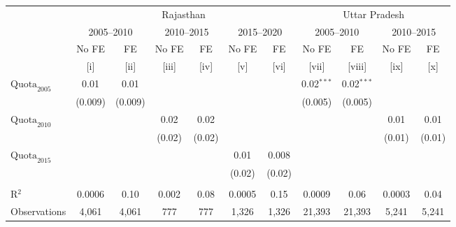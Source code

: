 
\begingroup
\centering
\scriptsize
\begin{adjustbox}{max width=\linewidth}
   \begin{threeparttable}[b]
      \begin{tabular}{lcccccccccc}
         \toprule
          & \multicolumn{6}{c}{Rajasthan} & \multicolumn{4}{c}{Uttar Pradesh} \\ 
          & \multicolumn{2}{c}{2005--2010} & \multicolumn{2}{c}{2010--2015} & \multicolumn{2}{c}{2015--2020} & \multicolumn{2}{c}{2005--2010} & \multicolumn{2}{c}{2010--2015} \\ 
                                & No FE   & FE            & No FE  & FE            & No FE  & FE            & No FE        & FE            & No FE  & FE \\   
                                & [i]     & [ii]          & [iii]  & [iv]          & [v]    & [vi]          & [vii]        & [viii]        & [ix]   & [x]\\  
         \midrule 
         $\text{Quota}_{2005}$  & 0.01    & 0.01          &        &               &        &               & 0.02$^{***}$ & 0.02$^{***}$  &        &   \\   
                                & (0.009) & (0.009)       &        &               &        &               & (0.005)      & (0.005)       &        &   \\   
         $\text{Quota}_{2010}$  &         &               & 0.02   & 0.02          &        &               &              &               & 0.01   & 0.01\\   
                                &         &               & (0.02) & (0.02)        &        &               &              &               & (0.01) & (0.01)\\   
         $\text{Quota}_{2015}$  &         &               &        &               & 0.01   & 0.008         &              &               &        &   \\   
                                &         &               &        &               & (0.02) & (0.02)        &              &               &        &   \\   
          \\
         R$^2$                  & 0.0006  & 0.10          & 0.002  & 0.08          & 0.0005 & 0.15          & 0.0009       & 0.06          & 0.0003 & 0.04\\  
         Observations           & 4,061   & 4,061         & 777    & 777           & 1,326  & 1,326         & 21,393       & 21,393        & 5,241  & 5,241\\  

\end{tabular}
\end{threeparttable}
\end{adjustbox}
